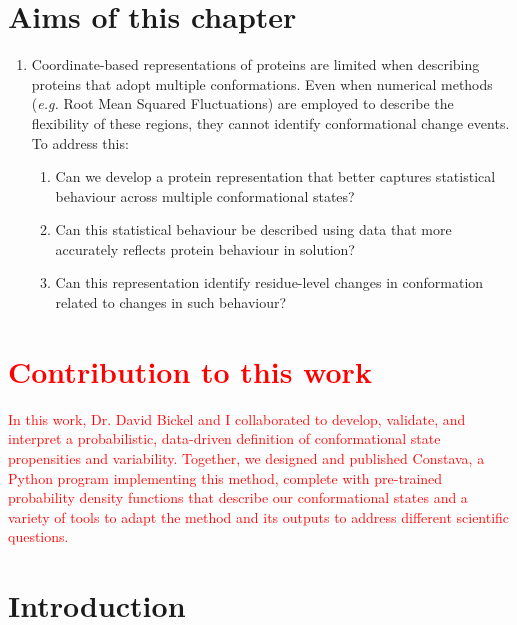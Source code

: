\section*{Aims of this chapter}
\begin{enumerate}
\item Coordinate-based representations of proteins are limited when describing proteins that adopt multiple conformations. Even when numerical methods (\textit{e.g.} Root Mean Squared Fluctuations) are employed to describe the flexibility of these regions, they cannot identify conformational change events. To address this: 
    \begin{enumerate}
        \item Can we develop a protein representation that better captures statistical behaviour across multiple conformational states?
        \item Can this statistical behaviour be described using data that more accurately reflects protein behaviour in solution?
        \item Can this representation identify residue-level changes in conformation related to changes in such behaviour?
    \end{enumerate}
\end{enumerate}

\section*{\textcolor{red}{Contribution to this work}}

\textcolor{red}{In this work, Dr. David Bickel and I collaborated to develop, validate, and interpret a probabilistic, data-driven definition of conformational state propensities and variability. Together, we designed and published Constava, a Python program implementing this method, complete with pre-trained probability density functions that describe our conformational states and a variety of tools to adapt the method and its outputs to address different scientific questions.}

\newpage

\section{Introduction}

